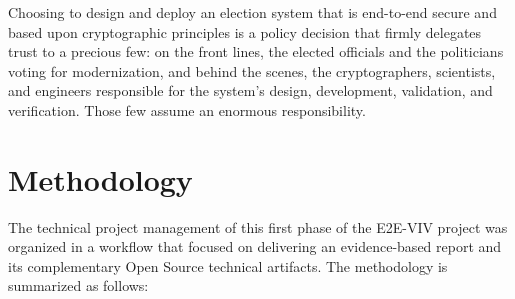 Choosing to design and deploy an election system that is end-to-end
secure and based upon cryptographic principles is a policy decision
that firmly delegates trust to a precious few: on the front lines, the
elected officials and the politicians voting for modernization, and
behind the scenes, the cryptographers, scientists, and engineers
responsible for the system’s design, development, validation, and
verification. Those few assume an enormous responsibility.

\section{Methodology}

The technical project management of this first phase of the E2E-VIV
project was organized in a workflow that focused on delivering an
evidence-based report and its complementary Open Source technical
artifacts. The methodology is summarized as follows:

